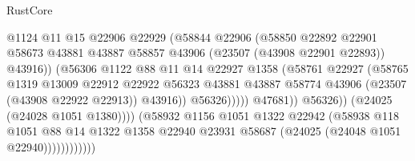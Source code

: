 \begin{lexlean}{RustCore}
\begin{coremodule}
                                        @1124
                                        @11
                                        @15
                                        @22906
                                        @22929
                                        (@58844
                                          @22906
                                          (@58850
                                            @22892
                                            @22901
                                            @58673
                                            @43881
                                            @43887
                                            @58857
                                            @43906
                                            (@23507 (@43908 @22901 @22893))
                                            @43916))
                                        (@56306
                                          @1122
                                          @88
                                          @11
                                          @14
                                          @22927
                                          @1358
                                          (@58761
                                            @22927
                                            (@58765
                                              @1319
                                              @13009
                                              @22912
                                              @22922
                                              @56323
                                              @43881
                                              @43887
                                              @58774
                                              @43906
                                              (@23507 (@43908 @22922 @22913))
                                              @43916))
                                          @56326)))))
                                @47681))
                            @56326))
                        (@24025 (@24028 @1051 @1380))))
                    (@58932
                      @1156
                      @1051
                      @1322
                      @22942
                      (@58938
                        @118
                        @1051
                        @88
                        @14
                        @1322
                        @1358
                        @22940
                        @23931
                        @58687
                        (@24025 (@24048 @1051 @22940))))))))))))

\end{coremodule}
\end{lexlean}
